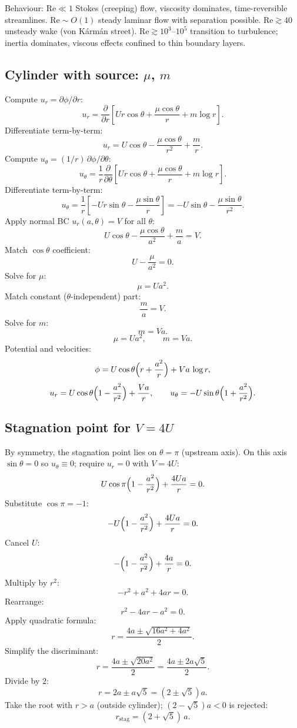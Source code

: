 \documentclass[11pt]{article}
\newcommand{\pd}[2]{\frac{\partial #1}{\partial #2}}
\begin{document}
Behaviour: $\mathrm{Re}\ll 1$ Stokes (creeping) flow, viscosity dominates, time-reversible streamlines. $\mathrm{Re}\sim O(1)$ steady laminar flow with separation possible. $\mathrm{Re}\gtrsim 40$ unsteady wake (von K\'arm\'an street). $\mathrm{Re}\gtrsim 10^{3}$--$10^{5}$ transition to turbulence; inertia dominates, viscous effects confined to thin boundary layers.

\subsection*{Cylinder with source: $\mu$, $m$}

Compute $u_r=\partial\phi/\partial r$:
\[ u_r=\pd{}{r}\!\left[Ur\cos\theta+\frac{\mu\cos\theta}{r}+m\log r\right]. \]
Differentiate term-by-term:
\[ u_r=U\cos\theta-\frac{\mu\cos\theta}{r^{2}}+\frac{m}{r}. \]
Compute $u_\theta=(1/r)\,\partial\phi/\partial\theta$:
\[ u_\theta=\frac{1}{r}\pd{}{\theta}\!\left[Ur\cos\theta+\frac{\mu\cos\theta}{r}+m\log r\right]. \]
Differentiate term-by-term:
\[ u_\theta=\frac{1}{r}\!\left[-Ur\sin\theta-\frac{\mu\sin\theta}{r}\right]=-U\sin\theta-\frac{\mu\sin\theta}{r^{2}}. \]
Apply normal BC $u_r(a,\theta)=V$ for all $\theta$:
\[ U\cos\theta-\frac{\mu\cos\theta}{a^{2}}+\frac{m}{a}=V. \]
Match $\cos\theta$ coefficient:
\[ U-\frac{\mu}{a^{2}}=0. \]
Solve for $\mu$:
\[ \mu=Ua^{2}. \]
Match constant ($\theta$-independent) part:
\[ \frac{m}{a}=V. \]
Solve for $m$:
\[ m=Va. \]
\[ \boxed{\;\mu=Ua^{2},\qquad m=Va.\;} \]
Potential and velocities:
\[ \phi=U\cos\theta\Bigl(r+\frac{a^{2}}{r}\Bigr)+Va\,\log r, \]
\[ u_r=U\cos\theta\Bigl(1-\frac{a^{2}}{r^{2}}\Bigr)+\frac{Va}{r},\qquad u_\theta=-U\sin\theta\Bigl(1+\frac{a^{2}}{r^{2}}\Bigr). \]

\subsection*{Stagnation point for $V=4U$}

By symmetry, the stagnation point lies on $\theta=\pi$ (upstream axis). On this axis $\sin\theta=0$ so $u_\theta\equiv 0$; require $u_r=0$ with $V=4U$:
\[ U\cos\pi\Bigl(1-\frac{a^{2}}{r^{2}}\Bigr)+\frac{4Ua}{r}=0. \]
Substitute $\cos\pi=-1$:
\[ -U\Bigl(1-\frac{a^{2}}{r^{2}}\Bigr)+\frac{4Ua}{r}=0. \]
Cancel $U$:
\[ -\Bigl(1-\frac{a^{2}}{r^{2}}\Bigr)+\frac{4a}{r}=0. \]
Multiply by $r^{2}$:
\[ -r^{2}+a^{2}+4ar=0. \]
Rearrange:
\[ r^{2}-4ar-a^{2}=0. \]
Apply quadratic formula:
\[ r=\frac{4a\pm\sqrt{16a^{2}+4a^{2}}}{2}. \]
Simplify the discriminant:
\[ r=\frac{4a\pm\sqrt{20a^{2}}}{2}=\frac{4a\pm 2a\sqrt{5}}{2}. \]
Divide by $2$:
\[ r=2a\pm a\sqrt{5}=(2\pm\sqrt{5})a. \]
Take the root with $r>a$ (outside cylinder); $(2-\sqrt{5})a<0$ is rejected:
\[ \boxed{\;r_{\text{stag}}=(2+\sqrt{5})\,a.\;} \]
\end{document}
